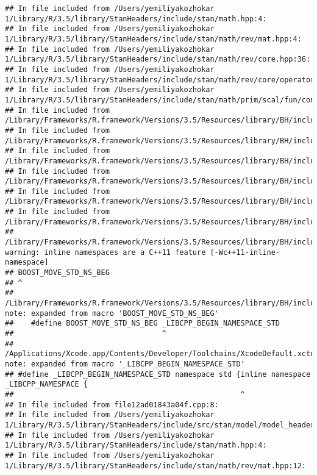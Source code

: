 \documentclass[]{article}
\begin{document}
\begin{verbatim}
## In file included from /Users/yemiliyakozhokar 1/Library/R/3.5/library/StanHeaders/include/stan/math.hpp:4:
## In file included from /Users/yemiliyakozhokar 1/Library/R/3.5/library/StanHeaders/include/stan/math/rev/mat.hpp:4:
## In file included from /Users/yemiliyakozhokar 1/Library/R/3.5/library/StanHeaders/include/stan/math/rev/core.hpp:36:
## In file included from /Users/yemiliyakozhokar 1/Library/R/3.5/library/StanHeaders/include/stan/math/rev/core/operator_unary_plus.hpp:7:
## In file included from /Users/yemiliyakozhokar 1/Library/R/3.5/library/StanHeaders/include/stan/math/prim/scal/fun/constants.hpp:4:
## In file included from /Library/Frameworks/R.framework/Versions/3.5/Resources/library/BH/include/boost/math/constants/constants.hpp:13:
## In file included from /Library/Frameworks/R.framework/Versions/3.5/Resources/library/BH/include/boost/math/tools/convert_from_string.hpp:15:
## In file included from /Library/Frameworks/R.framework/Versions/3.5/Resources/library/BH/include/boost/lexical_cast.hpp:32:
## In file included from /Library/Frameworks/R.framework/Versions/3.5/Resources/library/BH/include/boost/lexical_cast/try_lexical_convert.hpp:42:
## In file included from /Library/Frameworks/R.framework/Versions/3.5/Resources/library/BH/include/boost/lexical_cast/detail/converter_lexical.hpp:52:
## In file included from /Library/Frameworks/R.framework/Versions/3.5/Resources/library/BH/include/boost/container/container_fwd.hpp:61:
## /Library/Frameworks/R.framework/Versions/3.5/Resources/library/BH/include/boost/container/detail/std_fwd.hpp:27:1: warning: inline namespaces are a C++11 feature [-Wc++11-inline-namespace]
## BOOST_MOVE_STD_NS_BEG
## ^
## /Library/Frameworks/R.framework/Versions/3.5/Resources/library/BH/include/boost/move/detail/std_ns_begin.hpp:18:34: note: expanded from macro 'BOOST_MOVE_STD_NS_BEG'
##    #define BOOST_MOVE_STD_NS_BEG _LIBCPP_BEGIN_NAMESPACE_STD
##                                  ^
## /Applications/Xcode.app/Contents/Developer/Toolchains/XcodeDefault.xctoolchain/usr/include/c++/v1/__config:390:52: note: expanded from macro '_LIBCPP_BEGIN_NAMESPACE_STD'
## #define _LIBCPP_BEGIN_NAMESPACE_STD namespace std {inline namespace _LIBCPP_NAMESPACE {
##                                                    ^
## In file included from file12ad01843a04f.cpp:8:
## In file included from /Users/yemiliyakozhokar 1/Library/R/3.5/library/StanHeaders/include/src/stan/model/model_header.hpp:4:
## In file included from /Users/yemiliyakozhokar 1/Library/R/3.5/library/StanHeaders/include/stan/math.hpp:4:
## In file included from /Users/yemiliyakozhokar 1/Library/R/3.5/library/StanHeaders/include/stan/math/rev/mat.hpp:12:

\end{verbatim}
\end{document}
